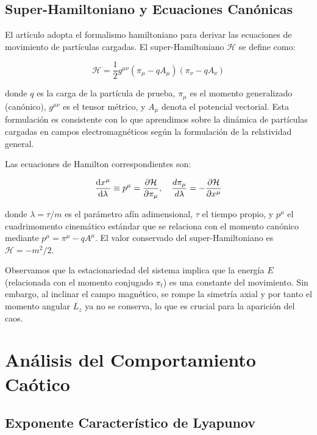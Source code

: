 \documentclass[a4paper,12pt]{article}
\begin{document}
\subsection{Super-Hamiltoniano y Ecuaciones Canónicas}

El artículo adopta el formalismo hamiltoniano para derivar las ecuaciones de movimiento de partículas cargadas. El super-Hamiltoniano $\mathcal{H}$ se define como:

\begin{equation}
\mathcal{H}=\textstyle{\frac{1}{2}}g^{\mu\nu}(\pi_{\mu}-qA_{\mu})(\pi_{\nu}-qA_{\nu})
\end{equation}

donde $q$ es la carga de la partícula de prueba, $\pi_{\mu}$ es el momento generalizado (canónico), $g^{\mu\nu}$ es el tensor métrico, y $A_{\mu}$ denota el potencial vectorial. Esta formulación es consistente con lo que aprendimos sobre la dinámica de partículas cargadas en campos electromagnéticos según la formulación de la relatividad general.

Las ecuaciones de Hamilton correspondientes son:

\begin{equation}
\frac{{\rm d}x^{\mu}}{{\rm d}\lambda}\equiv p^{\mu}=
\frac{\partial \mathcal{H}}{\partial \pi_{\mu}},
\quad 
\frac{d\pi_{\mu}}{d\lambda}=-\frac{\partial\mathcal{H}}{\partial x^{\mu}}
\end{equation}

donde $\lambda=\tau/m$ es el parámetro afín adimensional, $\tau$ el tiempo propio, y $p^{\mu}$ el cuadrimomento cinemático estándar que se relaciona con el momento canónico mediante $p^{\mu}=\pi^{\mu}-qA^{\mu}$. El valor conservado del super-Hamiltoniano es $\mathcal{H}=-m^2/2$.

Observamos que la estacionariedad del sistema implica que la energía $E$ (relacionada con el momento conjugado $\pi_t$) es una constante del movimiento. Sin embargo, al inclinar el campo magnético, se rompe la simetría axial y por tanto el momento angular $L_z$ ya no se conserva, lo que es crucial para la aparición del caos.

\section{Análisis del Comportamiento Caótico}

\subsection{Exponente Característico de Lyapunov}
\end{document}

